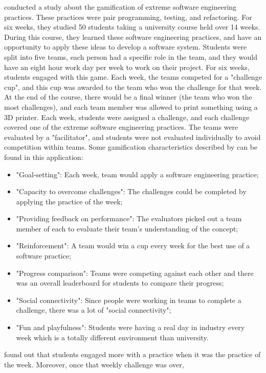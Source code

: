 \documentclass{l4proj}
\begin{document}
\citet{akpolat_enhancing_2014} conducted a study about the gamification of extreme software engineering practices. These practices were pair programming, testing, and refactoring.
For six weeks, they studied 50 students taking a university course held over 14 weeks. During this course, they learned these software engineering practices,
and have an opportunity to apply these ideas to develop a software system. Students were split into five teams, each person had a specific role in the team,
and they would have an eight hour work day per week to work on their project. For six weeks, students engaged with this game. Each week, the teams competed for a "challenge cup", 
and this cup was awarded to the team who won the challenge for that week. At the end of the course, there would be a final winner (the team who won the most challenges),
and each team member was allowed to print something using a 3D printer. Each week, students were assigned a challenge, 
and each challenge covered one of the extreme software engineering practices. The teams were evaluated by a "facilitator", 
and students were not evaluated individually to avoid competition within teams.
Some gamification characteristics described by \citet{cugelman_gamification:_2013} can be found in this application:
\begin{itemize}
    \item "Goal-setting": Each week, team would apply a software engineering practice;
    \item "Capacity to overcome challenges": The challenges could be completed by applying the practice of the week;
    \item "Providing feedback on performance": The evaluators picked out a team member of each to evaluate their team's understanding of the concept;
    \item "Reinforcement": A team would win a cup every week for the best use of a software practice;
    \item "Progress comparison": Teams were competing against each other and there was an overall leaderboard for students to compare their progress;
    \item "Social connectivity": Since people were working in teams to complete a challenge, there was a lot of "social connectivity";
    \item "Fun and playfulness": Students were having a real day in industry every week which is a totally different environment than university.
\end{itemize}
\citet{akpolat_enhancing_2014} found out that students engaged more with a practice when it was the practice of the week. Moreover, once that weekly challenge was over, 
\end{document}
